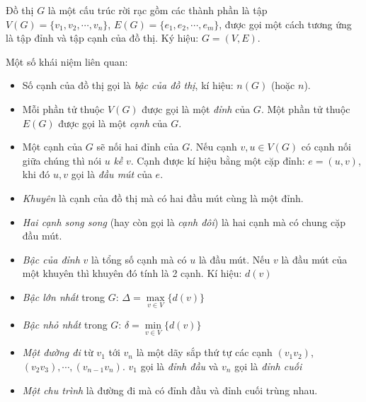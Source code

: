
\begin{definition}
	Đồ thị $G$ là một cấu trúc rời rạc gồm các thành phần là tập ${V(G) = \{v_1,v_2,\cdots,v_n\}}$, $E(G) = \{e_1,e_2,\cdots,e_m\}$, được gọi một cách tương ứng là tập đỉnh và tập cạnh của đồ thị. Ký hiệu: $G = (V, E)$.
\end{definition}
Một số khái niệm liên quan:
\begin{itemize}
	\item Số cạnh của đồ thị gọi là \textit{bậc của đồ thị}, kí hiệu: $n(G)$ (hoặc $n$).
	\item Mỗi phần tử thuộc $V(G)$ được gọi là một \textit{đỉnh} của $G$. Một phần tử thuộc $E(G)$ được gọi là một \textit{cạnh} của $G$.
	\item Một cạnh của $G$ sẽ nối hai đỉnh của $G$. Nếu cạnh $v,u \in V(G)$ có cạnh nối giữa chúng thì nói $u$ \textit{kề} $v$. Cạnh được kí hiệu bằng một cặp đỉnh: $e = (u,v)$, khi đó $u,v$ gọi là \textit{đầu mút} của $e$.
	\item \textit{Khuyên} là cạnh của đồ thị mà có hai đầu mút cùng là một đỉnh.
	\item \textit{Hai cạnh song song} (hay còn gọi là \textit{cạnh đôi}) là hai cạnh mà có chung cặp đầu mút.
	\item \textit{Bậc của đỉnh} $v$ là tổng số cạnh mà có $u$ là đầu mút. Nếu $v$ là đầu mút của một khuyên thì khuyên đó tính là 2 cạnh. Kí hiệu: $d(v)$
	\item \textit{Bậc lớn nhất} trong $G$: $\Delta = \max\limits_{v\in V} \{d(v)\}$
	\item \textit{Bậc nhỏ nhất} trong $G$: $\delta = \min\limits_{v\in V} \{d(v)\}$
	\item \textit{Một đường đi} từ $v_1$ tới $v_n$ là một dãy sắp thứ tự các cạnh $(v_1v_2)$, $(v_2v_3),\cdots,(v_{n-1}v_n)$. $v_1$ gọi là \textit{đỉnh đầu} và $v_n$ gọi là \textit{đỉnh cuối}
	\item \textit{Một chu trình} là đường đi mà có đỉnh đầu và đỉnh cuối trùng nhau.
\end{itemize}
